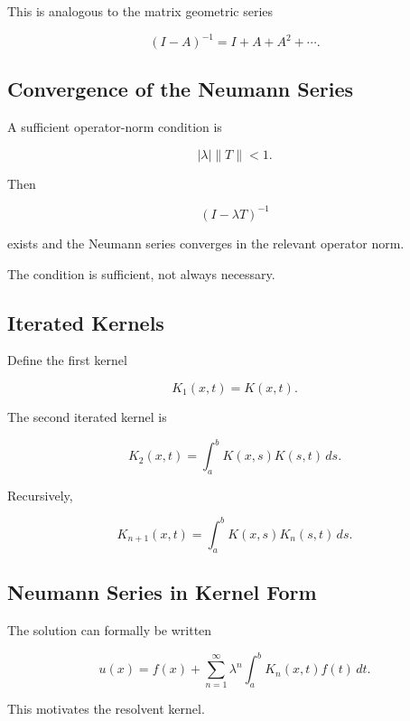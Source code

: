 This is analogous to the matrix geometric series

\[
(I-A)^{-1}
=
I+A+A^2+\cdots.
\]

\subsection{Convergence of the Neumann Series}
\label{subsec:neumann-series-convergence}

A sufficient operator-norm condition is

\[
\boxed{
|\lambda|
\|T\|
<
1.
}
\]

Then

\[
\boxed{
(I-\lambda T)^{-1}
}
\]

exists and the Neumann series converges in the relevant operator norm.

The condition is sufficient, not always necessary.

\subsection{Iterated Kernels}
\label{subsec:iterated-kernels}

Define the first kernel

\[
\boxed{
K_1(x,t)=K(x,t).
}
\]

The second iterated kernel is

\[
\boxed{
K_2(x,t)
=
\int_a^b
K(x,s)K(s,t)\,ds.
}
\]

Recursively,

\[
\boxed{
K_{n+1}(x,t)
=
\int_a^b
K(x,s)K_n(s,t)\,ds.
}
\]

\subsection{Neumann Series in Kernel Form}
\label{subsec:neumann-kernel-form}

The solution can formally be written

\[
u(x)
=
f(x)
+
\sum_{n=1}^{\infty}
\lambda^n
\int_a^b
K_n(x,t)f(t)\,dt.
\]

This motivates the resolvent kernel.

